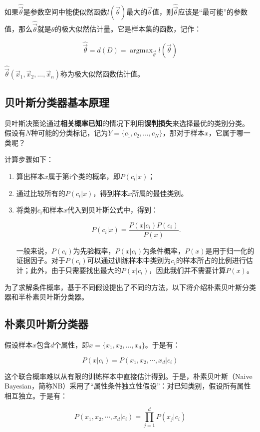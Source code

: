 如果$\hat{\vec\theta}$是参数空间中能使似然函数$l(\vec\theta)$最大的$\vec\theta$值，则$\hat{\vec\theta}$应该是``最可能''的参数值，那么$\hat{\vec\theta}$就是$\theta$的极大似然估计量。它是样本集的函数，记作：

$$
\hat{\vec\theta}=d(D)= \mathop {\arg \max}_{\vec\theta} l(\vec\theta )
$$

$\hat{\vec\theta}(\vec x_{1},\vec x_{2},...,\vec x_{n})$称为极大似然函数估计值。

\subsection{贝叶斯分类器基本原理}

贝叶斯决策论通过{\bf 相关概率已知}的情况下利用{\bf 误判损失}来选择最优的类别分类。 假设有$N$种可能的分类标记，记为$Y=\{c_1,c_2,...,c_N\}$，那对于样本${x}$，它属于哪一类呢？

计算步骤如下：

\begin{enumerate}\itemsep0em
		\item 算出样本${x}$属于第i个类的概率，即$P(c_i|x)$；
		\item 通过比较所有的$P(c_i|{x})$，得到样本${x}$所属的最佳类别。
		\item 将类别$c_i$和样本${x}$代入到贝叶斯公式中，得到：

		$$
		P(c_i|{x})=\frac{P({x}|c_i)P(c_i)}{P({x})}.
		$$

		一般来说，$P(c_i)$为先验概率，$P({x}|c_i)$为条件概率，$P({x})$是用于归一化的证据因子。对于$P(c_i)$可以通过训练样本中类别为$c_i$的样本所占的比例进行估计；此外，由于只需要找出最大的$P({x}|c_i)$，因此我们并不需要计算$P({x})$。
\end{enumerate}

为了求解条件概率，基于不同假设提出了不同的方法，以下将介绍朴素贝叶斯分类器和半朴素贝叶斯分类器。

\subsection{朴素贝叶斯分类器}


假设样本${x}$包含$d$个属性，即${x}=\{ x_1,x_2,...,x_d\}$。于是有：

$$
P({x}|c_i)=P(x_1,x_2,\cdots,x_d|c_i)
$$

这个联合概率难以从有限的训练样本中直接估计得到。于是，朴素贝叶斯（Naive Bayesian，简称NB）采用了``属性条件独立性假设''：对已知类别，假设所有属性相互独立。于是有：

$$
P(x_1,x_2,\cdots,x_d|c_i)=\prod_{j=1}^d P(x_j|c_i)
$$

